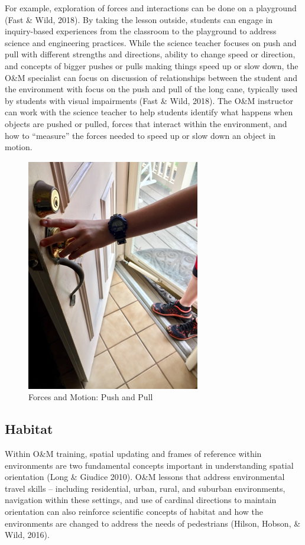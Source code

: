 \documentclass[11.5pt]{sig-alternate} %
\begin{document}
\begin{large}
For example, exploration of forces and interactions can be done on a playground (Fast \& Wild, 2018).  By taking the lesson outside, students can engage in inquiry-based experiences from the classroom to the playground to address science and engineering practices. While the science teacher focuses on push and pull with different strengths and directions, ability to change speed or direction, and concepts of bigger pushes or pulls making things speed up or slow down, the O\&M specialist can focus on discussion of relationships between the student and the environment with focus on the push and pull of the long cane, typically used by students with visual impairments (Fast \& Wild, 2018). The O\&M instructor can work with the science teacher to help students identify what happens when objects are pushed or pulled, forces that interact within the environment, and how to “measure” the forces needed to speed up or slow down an object in motion.
 
\begin{figure}[h]
    \centering
    \includegraphics[width=0.6\linewidth]{fig1.png}
    \caption{Forces and Motion: Push and Pull}
\end{figure}

\subsection*{Habitat}

Within O\&M training, spatial updating and frames of reference within environments are two fundamental concepts important in understanding spatial orientation (Long \& Giudice 2010).  O\&M lessons that address environmental travel skills – including residential, urban, rural, and suburban environments, navigation within these settings, and use of cardinal directions to maintain orientation can also reinforce scientific concepts of habitat and how the environments are changed to address the needs of pedestrians (Hilson, Hobson, \& Wild, 2016).


\end{large}
\end{document}
